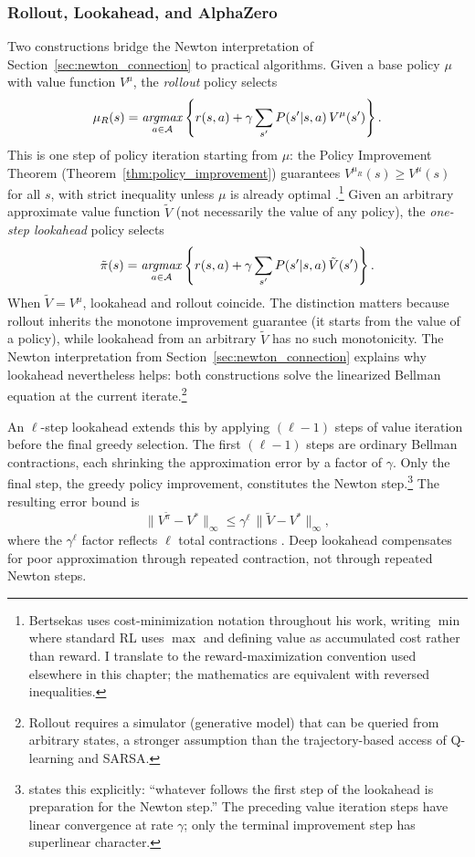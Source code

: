 \subsubsection{Rollout, Lookahead, and AlphaZero}

Two constructions bridge the Newton interpretation of Section~\ref{sec:newton_connection} to practical algorithms. Given a base policy $\mu$ with value function $V^\mu$, the \emph{rollout} policy selects
\begin{equation}
\mu_R(s) = \mathop{\it argmax}_{a \in \mathcal{A}} \left\{ r(s,a) + \gamma \sum_{s'} P(s'|s,a)\, V^\mu(s') \right\}.
\end{equation}
This is one step of policy iteration starting from $\mu$: the Policy Improvement Theorem (Theorem~\ref{thm:policy_improvement}) guarantees $V^{\mu_R}(s) \geq V^\mu(s)$ for all $s$, with strict inequality unless $\mu$ is already optimal \citep{bertsekas2021lessons}.\footnote{Bertsekas uses cost-minimization notation throughout his work, writing $\min$ where standard RL uses $\max$ and defining value as accumulated cost rather than reward. I translate to the reward-maximization convention used elsewhere in this chapter; the mathematics are equivalent with reversed inequalities.} Given an arbitrary approximate value function $\tilde{V}$ (not necessarily the value of any policy), the \emph{one-step lookahead} policy selects
\begin{equation}
\tilde{\pi}(s) = \mathop{\it argmax}_{a \in \mathcal{A}} \left\{ r(s,a) + \gamma \sum_{s'} P(s'|s,a)\, \tilde{V}(s') \right\}.
\end{equation}
When $\tilde{V} = V^\mu$, lookahead and rollout coincide. The distinction matters because rollout inherits the monotone improvement guarantee (it starts from the value of a policy), while lookahead from an arbitrary $\tilde{V}$ has no such monotonicity. The Newton interpretation from Section~\ref{sec:newton_connection} explains why lookahead nevertheless helps: both constructions solve the linearized Bellman equation at the current iterate.\footnote{Rollout requires a simulator (generative model) that can be queried from arbitrary states, a stronger assumption than the trajectory-based access of Q-learning and SARSA.}

An $\ell$-step lookahead extends this by applying $(\ell - 1)$ steps of value iteration before the final greedy selection. The first $(\ell - 1)$ steps are ordinary Bellman contractions, each shrinking the approximation error by a factor of $\gamma$. Only the final step, the greedy policy improvement, constitutes the Newton step.\footnote{\citet{bertsekas2021lessons} states this explicitly: ``whatever follows the first step of the lookahead is preparation for the Newton step.'' The preceding value iteration steps have linear convergence at rate $\gamma$; only the terminal improvement step has superlinear character.} The resulting error bound is
\begin{equation}
\|V^{\tilde{\pi}} - V^*\|_\infty \leq \gamma^\ell \, \|\tilde{V} - V^*\|_\infty,
\end{equation}
where the $\gamma^\ell$ factor reflects $\ell$ total contractions \citep[Prop.~2.3.1]{bertsekas2022}. Deep lookahead compensates for poor approximation through repeated contraction, not through repeated Newton steps.

